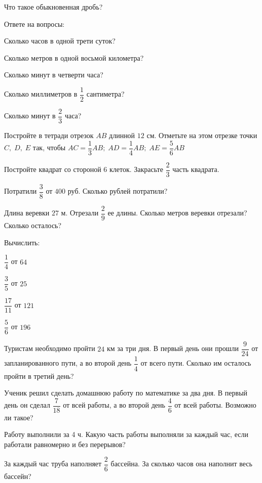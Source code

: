 \begin{listofex}
	\item Что такое обыкновенная дробь?
	\item Ответе на вопросы:
	\begin{enumcols}[itemcolumns=1]
		\item Сколько часов в одной трети суток?
		\item Сколько метров в одной восьмой километра?
		\item Сколько минут в четверти часа?
		\item Сколько миллиметров в \( \dfrac{1}{2} \) сантиметра?
		\item Сколько минут в \( \dfrac{2}{3} \) часа?
	\end{enumcols}
	\item Постройте в тетради отрезок \( AB \) длинной \( 12 \) см. Отметьте на этом отрезке точки \( C,\;D,\;E \) так, чтобы \( AC=\dfrac{1}{3}AB;\;AD=\dfrac{1}{4}AB;\;AE=\dfrac{5}{6}AB \)
	\item Постройте квадрат со стороной 6 клеток. Закрасьте \( \dfrac{2}{3} \) часть квадрата.
\end{listofex}
\begin{listofex}[start=5]
	\item Потратили \( \dfrac{3}{8} \) от \( 400 \) руб. Сколько рублей потратили?
	\item Длина веревки \( 27 \) м. Отрезали \( \dfrac{2}{9} \) ее длины. Сколько метров веревки отрезали? Сколько осталось?
	\item Вычислить:
	\begin{enumcols}[itemcolumns=4]
		\item \( \dfrac{1}{4} \) от \( 64 \)
		\item \( \dfrac{3}{5} \) от \( 25 \)
		\item \( \dfrac{17}{11} \) от \( 121 \)
		\item \( \dfrac{5}{6} \) от \( 196 \)
	\end{enumcols}
	\item Туристам необходимо пройти \( 24 \) км за три дня. В первый день они прошли \( \dfrac{9}{24} \) от запланированного пути, а во второй день \( \dfrac{1}{4} \) от всего пути. Сколько им осталось пройти в третий день?
	\item Ученик решил сделать домашнюю работу по математике за два дня. В первый день он сделал \( \dfrac{7}{18} \) от всей работы, а во второй день \( \dfrac{4}{6} \) от всей работы. Возможно ли такое?
	\item Работу выполнили за 4 ч. Какую часть работы выполняли за каждый час, если работали равномерно и без перерывов?
	\item За каждый час труба наполняет \( \dfrac{2}{6} \) бассейна. За сколько часов она наполнит весь бассейн?
\end{listofex}
